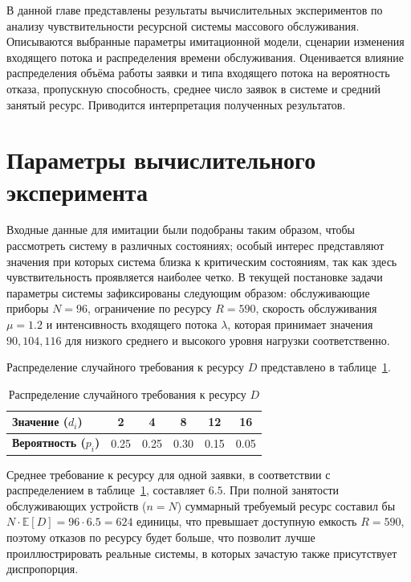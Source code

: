 \label{ch:results_and_sensitivity}

В данной главе представлены результаты вычислительных экспериментов по анализу чувствительности ресурсной системы массового обслуживания. Описываются выбранные параметры имитационной модели, сценарии изменения входящего потока и распределения времени обслуживания. Оценивается влияние распределения объёма работы заявки и типа входящего потока на вероятность отказа, пропускную способность, среднее число заявок в системе и средний занятый ресурс. Приводится интерпретация полученных результатов.

\section{Параметры вычислительного эксперимента}
\label{sec:exp_params}

Входные данные для имитации были подобраны таким образом, чтобы рассмотреть систему в различных состояниях\cite{jain1991_performance_analysis,law2015_simulation_modeling}; особый интерес представляют значения при которых система близка к критическим состояниям, так как здесь чувствительность проявляется наиболее четко\cite{jain1991_performance_analysis}. В текущей постановке задачи параметры системы зафиксированы следующим образом:  обслуживающие приборы $N = 96$, ограничение по ресурсу $R = 590$, скорость обслуживания $\mu = 1.2$ и интенсивность входящего потока $\lambda$, которая принимает значения $90, 104, 116$ для низкого среднего и высокого уровня нагрузки соответственно. 

Распределение случайного требования к ресурсу $D$ представлено в таблице~\ref{tab:resource_dist}.

\begin{table}[h!]
    \centering
    \caption{Распределение случайного требования к ресурсу $D$}
    \label{tab:resource_dist}
    \begin{tabular}{|l|c|c|c|c|c|}
        \hline
        \textbf{Значение ($d_i$)} & 2 & 4 & 8 & 12 & 16 \\ \hline
        \textbf{Вероятность ($p_i$)} & 0.25 & 0.25 & 0.30 & 0.15 & 0.05 \\ \hline
    \end{tabular}
\end{table}

Среднее требование к ресурсу для одной заявки, в соответствии с распределением в таблице~\ref{tab:resource_dist}, составляет $6.5$. При полной занятости обслуживающих устройств ($n=N$) суммарный требуемый ресурс составил бы $N \cdot \mathbb{E}[D] = 96 \cdot 6.5 = 624$ единицы, что превышает доступную емкость $R = 590$, поэтому отказов по ресурсу будет больше, что позволит лучше проиллюстрировать реальные системы, в которых зачастую также присутствует диспропорция\cite{naumov_total_resources_2016,naumov_samouylov_multiresource_loss_2017}. 

